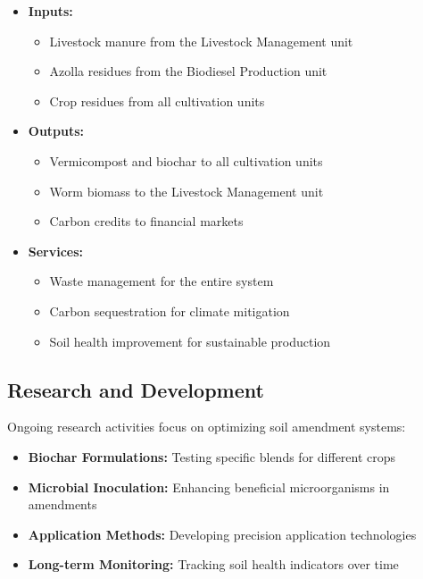 \begin{itemize}
    \item \textbf{Inputs:}
    \begin{itemize}
        \item Livestock manure from the Livestock Management unit
        \item Azolla residues from the Biodiesel Production unit
        \item Crop residues from all cultivation units
    \end{itemize}
    
    \item \textbf{Outputs:}
    \begin{itemize}
        \item Vermicompost and biochar to all cultivation units
        \item Worm biomass to the Livestock Management unit
        \item Carbon credits to financial markets
    \end{itemize}
    
    \item \textbf{Services:}
    \begin{itemize}
        \item Waste management for the entire system
        \item Carbon sequestration for climate mitigation
        \item Soil health improvement for sustainable production
    \end{itemize}
\end{itemize}

\subsection{Research and Development}

Ongoing research activities focus on optimizing soil amendment systems:

\begin{itemize}
    \item \textbf{Biochar Formulations:} Testing specific blends for different crops
    \item \textbf{Microbial Inoculation:} Enhancing beneficial microorganisms in amendments
    \item \textbf{Application Methods:} Developing precision application technologies
    \item \textbf{Long-term Monitoring:} Tracking soil health indicators over time
\end{itemize}
